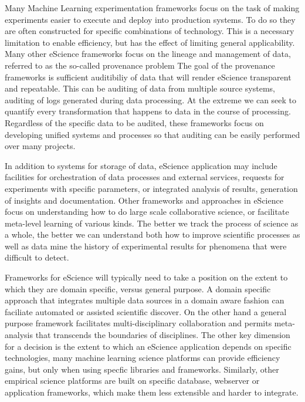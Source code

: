 \documentclass[sigconf]{acmart}
\begin{document}
Many Machine Learning experimentation frameworks focus on the task of making experiments
easier to execute and deploy into production systems\cite{Alberti:2018,MolnerDomenech:2020}. 
To do so they are often constructed for specific combinations of technology. This is a necessary limitation 
to enable efficiency, but has the effect of limiting general applicability.
Many other eScience frameworks focus on the lineage and management of data, referred to as 
the so-called provenance problem \cite{Sahoo:2008,Conquest:2021}
The goal of the provenance frameworks is sufficient auditibiliy of data that will 
render eScience transparent and repeatable. This can be auditing of data from multiple source systems,
auditing of logs generated during data processing\cite{Ferdous2020}. At the extreme we can seek to
quantify every transformation that happens to data in the course of processing\cite{Sahoo2009}. 
Regardless of the
specific data to be audited, these frameworks focus on developing unified systems and processes so
that auditing can be easily performed over many projects.

In addition to systems for storage of data, eScience application may include facilities for orchestration
of data processes and external services\cite{Subramanian2013}, requests for experiments with specific 
parameters\cite{Hunter:2005}, or integrated analysis of results, generation of insights and documentation. 
Other frameworks and approaches in eScience focus on understanding how to do large scale collaborative science, or
facilitate meta-level learning of various kinds\cite{Hunter:2005,Liu:2023}. The better we track the
process of science as a whole, the better we can understand both how to improve scientific processes
as well as data mine the history of experimental results for phenomena that were difficult to detect.

Frameworks for eScience will typically need to take a position on the extent to which they are domain
specific, versus general purpose. A domain specific approach that integrates multiple data sources in
a domain aware fashion can faciliate automated or assisted scientific discover\cite{Howe2008}. On the
other hand a general purpose framework facilitates multi-disciplinary collaboration and permits meta-analysis
that transcends the boundaries of disciplines. The other key dimension for a decision is the extent to
which an eScience application depends on specific technologies, many machine learning science platforms
can provide efficiency gains, but only when using specfic libraries and frameworks\cite{Alberti:2018,MolnerDomenech:2020}.
Similarly, other empirical science platforms are built on specific database, webserver or application
frameworks, which make them less extensible and harder to integrate.
\end{document}
